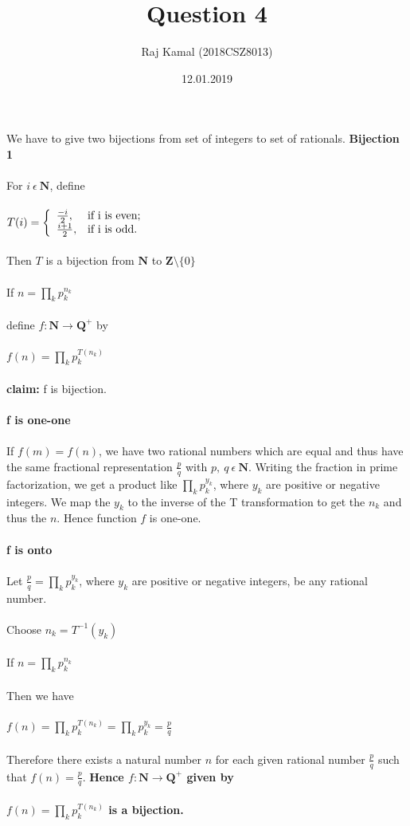 \documentclass{article}
\title{Question 4}
\author{Raj Kamal (2018CSZ8013) }
\date{12.01.2019}
\begin{document}
\maketitle
We have to give two bijections from set of integers to set of rationals. \newline \newline
\textbf{Bijection 1} \\ \\
For $i~ \epsilon ~\mathbf{N}$, define \\ \\ $T(i)=\left\{
               \begin{array}{ll}
                 \frac{-i}{2}, & \hbox{if i is even;} \\
                 \frac{i+1}{2}, & \hbox{if i is odd.}
               \end{array}
             \right.$
\\ \\ Then $T$ is a bijection from $\mathbf{N}$ to $\mathbf{Z}\setminus\{0\}$
\\ \\If $n = \prod_{k}p_k^{n_k}$
\\ \\define $f: \mathbf{N}\rightarrow \mathbf{Q^+}$ by\\ \\ $f(n)=\prod_{k}p_k^{T(n_k)}$
\\ \\ \textbf{claim:} f is bijection.
\\ \\ \textbf{f is one-one} \\ \\ If $f(m)=f(n)$, we have two rational numbers which are equal and thus have the same fractional representation $\frac{p}{q}$ with $p,~q ~\epsilon~ \mathbf{N}$. Writing the fraction in prime factorization, we get a product like $\prod_{k}p_k^{y_k}$, where $y_k$ are positive or negative integers. We map the $y_k$ to the inverse of the T transformation to get the $n_k$ and thus the $n$. Hence function $f$ is one-one.
\\ \\ \textbf{f is onto} \\ \\ Let $\frac{p}{q}=\prod_{k}p_k^{y_k}$, where $y_k$ are positive or negative integers, be any rational number. \\ \\ Choose $n_k = T^{-1}(y_k)$ \\ \\ If $n=\prod_{k}p_k^{n_k}$ \\ \\ Then we have \\ \\ $f(n)=\prod_{k}p_k^{T(n_k)}=\prod_{k}p_k^{y_k}=\frac{p}{q}$ \\ \\ Therefore there exists a natural number $n$ for each given rational number $\frac{p}{q}$ such that $f(n)=\frac{p}{q}$. \textbf{Hence $f: \mathbf{N}\rightarrow \mathbf{Q^+}$ given by\\ \\ $f(n)=\prod_{k}p_k^{T(n_k)}$ is a bijection.}
\end{document}
